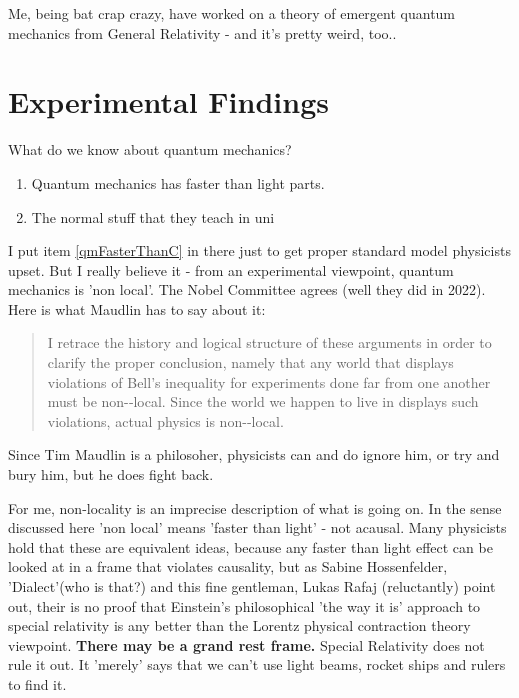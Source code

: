 \documentclass[../rzero]{subfiles}
\begin{document}
Me, being bat crap crazy, have worked on a theory of emergent quantum mechanics from General Relativity - and it's pretty weird, too.\cite{Andersen2016}.

\section{Experimental Findings}
What do we know about quantum mechanics?

\begin{enumerate}
	\item{Quantum mechanics has faster than light parts.}\label{qmFasterThanC}
	\item{The normal stuff that they teach in uni}
\end{enumerate}

I put item \ref{qmFasterThanC} in there just to get proper standard model physicists upset. But I really believe it -  from an experimental viewpoint, quantum mechanics is 'non local'. The Nobel Committee agrees\cite{AllNobelPrizes} (well they did in 2022). Here is what Maudlin has to say about it\cite{Maudlind}:

\begin{quotation}
	I retrace the history and logical structure of these arguments in order to clarify the proper conclusion, namely that any world that displays violations of Bell’s inequality for experiments done far from one another must be non-­‐local. Since the world we happen to live in displays such violations, actual physics is non-­‐local.
\end{quotation}

Since Tim Maudlin is a philosoher, physicists can and do ignore him, or try and bury him\cite{Werner2014}, but he does fight back\cite{WMaudlin2014}. 

For me, non-locality is an imprecise description of what is going on. In the sense discussed here 'non local' means 'faster than light' - not acausal. Many physicists hold that these are equivalent ideas, because any faster than light effect can be looked at in a frame that violates causality, but as Sabine Hossenfelder\cite{sabinehossenfelderThinkFasterLight2023}, 'Dialect'(who is that?)\cite{dialectWhatTimeDilation2023} and this fine gentleman, Lukas Rafaj (reluctantly)\cite{physics-problemsandsolutionsOneWaySpeed2023} point out, their is no proof that Einstein's philosophical 'the way it is' approach to special relativity is any better than the Lorentz physical contraction theory viewpoint. \textbf{There may be a grand rest frame.} Special Relativity does not rule it out. It 'merely' says that we can't use light beams, rocket ships and rulers to find it. 
\end{document}
